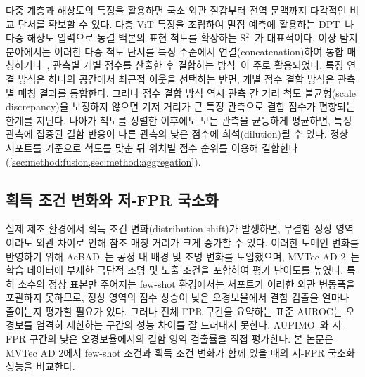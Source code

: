 다중 계층과 해상도의 특징을 활용하면 국소 외관 질감부터 전역 문맥까지 다각적인 비교 단서를 확보할 수 있다.
다층 ViT 특징을 조립하여 밀집 예측에 활용하는 DPT~\cite{ranftl2021vision}나 다중 해상도 입력으로 동결 백본의 표현 척도를 확장하는 S$^2$~\cite{shi2024scaling}가 대표적이다.
이상 탐지 분야에서는 이러한 다중 척도 단서를 특징 수준에서 연결(concatenation)하여 통합 매칭하거나~\cite{patchcore}, 관측별 개별 점수를 산출한 후 결합하는 방식~\cite{superad,freepatch}이 주로 활용되었다.
특징 연결 방식은 하나의 공간에서 최근접 이웃을 선택하는 반면, 개별 점수 결합 방식은 관측별 매칭 결과를 통합한다.
그러나 점수 결합 방식 역시 관측 간 거리 척도 불균형(scale discrepancy)을 보정하지 않으면 기저 거리가 큰 특정 관측으로 결합 점수가 편향되는 한계를 지닌다.
나아가 척도를 정렬한 이후에도 모든 관측을 균등하게 평균하면, 특정 관측에 집중된 결함 반응이 다른 관측의 낮은 점수에 희석(dilution)될 수 있다.
 정상 서포트를 기준으로 척도를 맞춘 뒤 위치별 점수 순위를 이용해 결합한다(\cref{sec:method:fusion,sec:method:aggregation}).

\subsection{획득 조건 변화와 저-FPR 국소화}
\label{sec:related:shift}

실제 제조 환경에서 획득 조건 변화(distribution shift)가 발생하면, 무결함 정상 영역이라도 외관 차이로 인해 참조 매칭 거리가 크게 증가할 수 있다.
이러한 도메인 변화를 반영하기 위해 AeBAD~\cite{aebad}는 공정 내 배경 및 조명 변화를 도입했으며, MVTec AD 2~\cite{mvtecad2}는 학습 데이터에 부재한 극단적 조명 및 노출 조건을 포함하여 평가 난이도를 높였다.
특히 소수의 정상 표본만 주어지는 few-shot 환경에서는 서포트가 이러한 외관 변동폭을 포괄하지 못하므로, 정상 영역의 점수 상승이 낮은 오경보율에서 결함 검출을 얼마나 줄이는지 평가할 필요가 있다.
그러나 전체 FPR 구간을 요약하는 표준 AUROC는 오경보를 엄격히 제한하는 구간의 성능 차이를 잘 드러내지 못한다. AUPIMO~\cite{aupimo}와 저-FPR 구간의  낮은 오경보율에서의 결함 영역 검출률을 직접 평가한다.
본 논문은 MVTec AD 2에서 few-shot 조건과 획득 조건 변화가 함께 있을 때의 저-FPR 국소화 성능을 비교한다.
